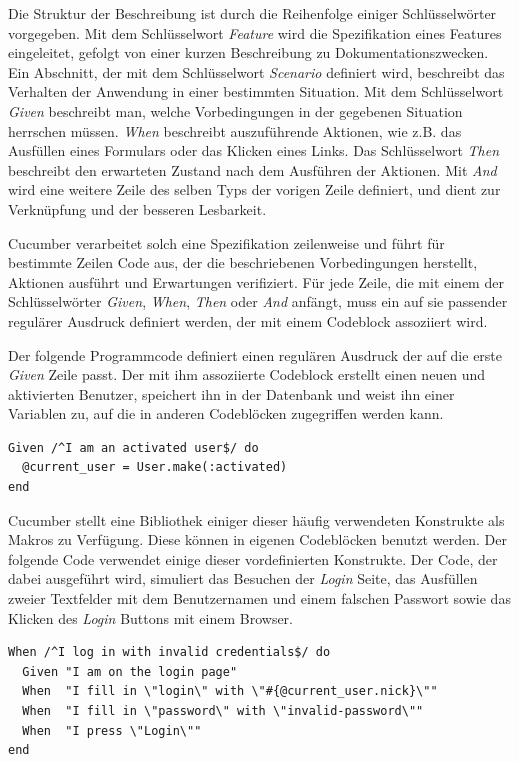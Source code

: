 Die Struktur der Beschreibung ist durch die Reihenfolge einiger
Schlüssel\-wörter vorgegeben. Mit dem Schlüsselwort \textit{Feature}
wird die Spezifikation eines Features eingeleitet, gefolgt von einer
kurzen Beschreibung zu Dokumentationszwecken. Ein Abschnitt, der mit
dem Schlüsselwort \textit{Scenario} definiert wird, beschreibt das
Verhalten der Anwendung in einer bestimmten Situation. Mit dem
Schlüsselwort \textit{Given} beschreibt man, welche Vorbedingungen in
der gegebenen Situation herrschen müssen. \textit{When} beschreibt
auszuführende Aktionen, wie z.B. das Ausfüllen eines Formulars oder
das Klicken eines Links. Das Schlüsselwort \textit{Then} beschreibt
den erwarteten Zustand nach dem Ausführen der Aktionen. Mit
\textit{And} wird eine weitere Zeile des selben Typs der vorigen Zeile
definiert, und dient zur Verknüpfung und der besseren Lesbarkeit.

Cucumber verarbeitet solch eine Spezifikation zeilenweise und führt
für bestimmte Zeilen Code aus, der die beschriebenen Vorbedingungen
herstellt, Aktionen ausführt und Erwartungen verifiziert. Für jede
Zeile, die mit einem der Schlüsselwörter \textit{Given},
\textit{When}, \textit{Then} oder \textit{And} anfängt, muss ein auf
sie passender regulärer Ausdruck definiert werden, der mit einem
Codeblock assoziiert wird.

Der folgende Programmcode definiert einen regulären Ausdruck der auf
die erste \textit{Given} Zeile passt. Der mit ihm assoziierte Codeblock
erstellt einen neuen und aktivierten Benutzer, speichert ihn in der
Datenbank und weist ihn einer Variablen zu, auf die in anderen
Codeblöcken zugegriffen werden kann.

\begin{lstlisting}
Given /^I am an activated user$/ do
  @current_user = User.make(:activated)
end
\end{lstlisting}

Cucumber stellt eine Bibliothek einiger dieser häufig verwendeten
Konstrukte als Makros zu Verfügung. Diese können in eigenen
Codeblöcken benutzt werden. Der folgende Code verwendet einige dieser
vordefinierten Konstrukte. Der Code, der dabei ausgeführt wird,
simuliert das Besuchen der \textit{Login} Seite, das Ausfüllen zweier
Textfelder mit dem Benutzernamen und einem falschen Passwort sowie das
Klicken des \textit{Login} Buttons mit einem Browser.

\begin{lstlisting}
When /^I log in with invalid credentials$/ do
  Given "I am on the login page"
  When  "I fill in \"login\" with \"#{@current_user.nick}\""
  When  "I fill in \"password\" with \"invalid-password\""
  When  "I press \"Login\""
end
\end{lstlisting}

